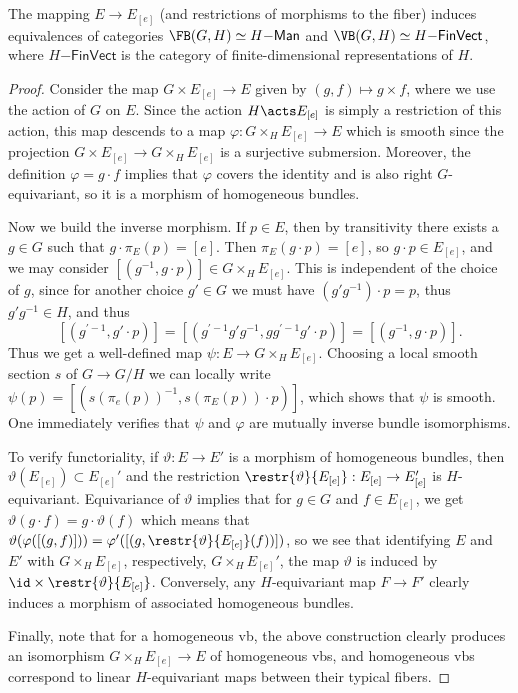 \begin{thm}\label{prop 1.4.3 Cap}
    The mapping $E\to E_{[e]}$ (and restrictions of morphisms to the fiber) induces equivalences of categories $\FB(G,H)\simeq H\mathsf{-Man}$ and $\VB(G,H)\simeq H\mathsf{-FinVect}$, where $H\mathsf{-FinVect}$ is the category of finite-dimensional representations of $H$.
\end{thm}
\begin{proof}
    Consider the map $G\times E_{[e]}\to E$ given by $(g,f)\mapsto g\times f$, where we use the action of $G$ on $E$. Since the action $H\acts E_{[e]}$ is simply a restriction of this action, this map descends to a map $\varphi:G\times_H E_{[e]}\to E$ which is smooth since the projection $G\times E_{[e]}\to G\times_H E_{[e]}$ is a surjective submersion. Moreover, the definition $\varphi=g\cdot f$ implies that $\varphi$ covers the identity and is also right $G$-equivariant, so it is a morphism of homogeneous bundles.

    Now we build the inverse morphism. If $p\in E$, then by transitivity there exists a $g\in G$ such that $g\cdot \pi_E(p)=[e]$. Then $\pi_E(g\cdot p)=[e]$, so $g\cdot p\in E_{[e]}$, and we may consider $[(g^{-1},g\cdot p)]\in G\times_H E_{[e]}$. This is independent of the choice of $g$, since for another choice $g'\in G$ we must have $(g'g^{-1})\cdot p=p$, thus $g'g^{-1}\in H$, and thus
    \[[(g^{\prime-1},g'\cdot p)]=[(g^{\prime-1}g'g^{-1},gg^{\prime-1}g'\cdot p)]=[(g^{-1},g\cdot p)].\]
    Thus we get a well-defined map $\psi:E\to G\times_H E_{[e]}$. Choosing a local smooth section $s$ of $G\to G\slash H$ we can locally write $\psi(p)=[(s(\pi_e(p))^{-1},s(\pi_E(p))\cdot p)]$, which shows that $\psi$ is smooth. One immediately verifies that $\psi$ and $\varphi$ are mutually inverse bundle isomorphisms.

    To verify functoriality, if $\vartheta:E\to E'$ is a morphism of homogeneous bundles, then $\vartheta(E_{[e]})\subset E_{[e]}'$ and the restriction $\restr{\vartheta}{E_{[e]}}:E_{[e]}\to E_{[e]}'$ is $H$-equivariant. Equivariance of $\vartheta$ implies that for $g\in G$ and $f\in E_{[e]}$, we get $\vartheta(g\cdot f)=g\cdot \vartheta(f)$ which means that $\vartheta(\varphi([(g,f)]))=\varphi'([(g,\restr{\vartheta}{E_{[e]}}(f))])$, so we see that identifying $E$ and $E'$ with $G\times_H E_{[e]}$, respectively, $G\times_H E_{[e]}'$, the map $\vartheta$ is induced by $\id\times \restr{\vartheta}{E_{[e]}}$. Conversely, any $H$-equivariant map $F\to F'$ clearly induces a morphism of associated homogeneous bundles.

    Finally, note that for a homogeneous \gls{vb}, the above construction clearly produces an isomorphism $G\times_H E_{[e]}\to E$ of homogeneous \glspl{vb}, and homogeneous \glspl{vb} correspond to linear $H$-equivariant maps between their typical fibers.
\end{proof}

